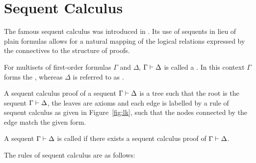 \section{Sequent Calculus}
\label{sec:lk}

The famous sequent calculus was introduced in \cite{Gentzen}.
Its use of sequents in lieu of plain formulas allows for a natural mapping of the logical relations expressed by the connectives to the structure of proofs.

\begin{defi} 
	For multisets of first-order formulas $\Gamma$ and $\Delta$, $\Gamma \vdash \Delta$ is called a . 
	In this context $\Gamma$ forms the , whereas $\Delta$ is referred to as .

	A sequent calculus proof of a sequent $\Gamma \vdash \Delta$ is a tree such that the root is the sequent $\Gamma \vdash \Delta$, the leaves are axioms and each edge is labelled by a rule of sequent calculus as given in Figure~\ref{fig:lk}, such that the nodes connected by the edge match the given form. 

	A sequent $\Gamma \vdash \Delta$ is called  if there exists a sequent calculus proof of $\Gamma \proves\nolinebreak \Delta$.
\end{defi}

The rules of sequent calculus are as follows:

